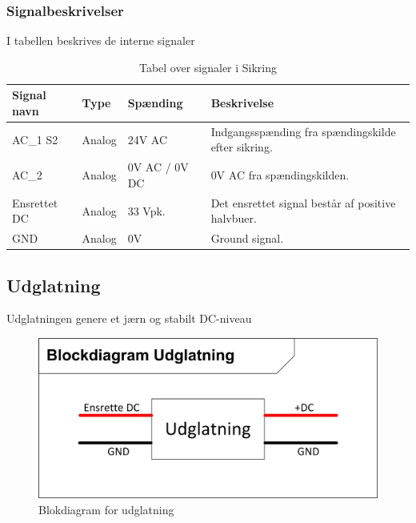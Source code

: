 \subsubsection{Signalbeskrivelser}
I tabellen beskrives de interne signaler
\begin{table}[H]
\begin{tabular}{|p{3cm}|p{3cm}|p{3cm}|p{4.5cm}|} \hline
\cellcolor[gray]{0.85}Signal navn& \cellcolor[gray]{0.85}Type &\cellcolor[gray]{0.85}Spænding&\cellcolor[gray]{0.85}Beskrivelse\\ \hline
AC\_1 S2 & Analog  & 24V AC & Indgangsspænding fra spændingskilde efter sikring.\\  \hline
AC\_2  & Analog & 0V AC / 0V DC & 0V AC fra spændingskilden. \\  \hline
Ensrettet DC & Analog & 33 Vpk. & Det ensrettet signal består af positive halvbuer. \\ \hline
GND & Analog & 0V & Ground signal.\\ \hline
\end{tabular}
\caption{Tabel over signaler i Sikring}
\label{table:Ensretter}
\end{table}
\newpage
\subsection{Udglatning}
Udglatningen genere et jærn og stabilt DC-niveau
\begin{figure}[H]
\centering
\includegraphics[scale=1]{billeder/UdglatningsBlok}
\caption{Blokdiagram for udglatning}
\label{fig:UdglatningBlok}
\end{figure}
